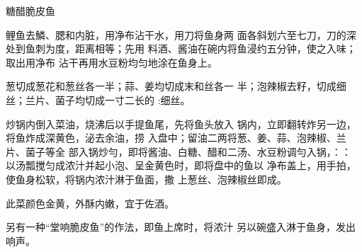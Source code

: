 \begin{recipe}{糖醋脆皮鱼}

\ingredients



\cooking

\step 鲤鱼去鱗、腮和内脏，用净布沾干水，用刀将鱼身两 面各斜划六至七刀，刀的深处到鱼刺为度，距离相等；先用 料酒、酱油在碗内将鱼浸约五分钟，使之入味；取出用净布 沾干再用水豆粉均匀地涂在鱼身上。

\step 葱切成葱花和葱丝各一半；蒜、姜均切成末和丝各一 半；泡辣椒去籽，切成细丝；兰片、菌子均切成一寸二长的 :细丝。

\step 炒锅内倒入菜油，烧沸后以手提鱼尾，先将鱼头放入 锅内，立即翻转炸另一边，将鱼炸成深黄色，泌去余油，捞 入盘中；留油二两将葱、姜、蒜、泡辣椒、兰片、菌子等全 部入锅炒勻，即将酱油、白糖、醋和二汤、水豆粉调勻入锅，：： 以汤瓢搅匀成浓汁并起小泡、呈金黄色时，即将盘中的鱼以 净布盖上，用手拍，使鱼身松软，将锅内浓汁淋于鱼面，撒 上葱丝、泡辣椒丝即成。

\notes

此菜颜色金黄，外酥内嫩，宜于佐酒。

另有一种“堂响脆皮鱼”的作法，即鱼上席时，将浓汁 另以碗盛入淋于鱼身，发出响声。

\end{recipe}

